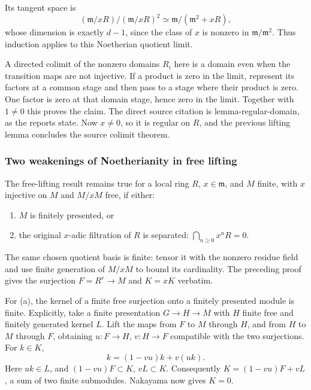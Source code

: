 Its tangent space is \[
 (\mathfrak m/xR)/(\mathfrak m/xR)^2
 \simeq\mathfrak m/(\mathfrak m^2+xR),
\] whose dimension is exactly \(d-1\), since the class of \(x\) is nonzero in \(\mathfrak m/\mathfrak m^2\). Thus induction applies to this Noetherian quotient limit.

A directed colimit of the nonzero domains \(R_i\) here is a domain even when the transition maps are not injective. If a product is zero in the limit, represent its factors at a common stage and then pass to a stage where their product is zero. One factor is zero at that domain stage, hence zero in the limit. Together with \(1\ne0\) this proves the claim. The direct source citation is lemma-regular-domain, as the reports state. Now \(x\ne0\), so it is regular on \(R\), and the previous lifting lemma concludes the source colimit theorem.

\subsubsection{Two weakenings of Noetherianity in free lifting}\label{algebra-proof-020-two-weakenings-of-noetherianity-in-free-lifting}

The free-lifting result remains true for a local ring \(R\), \(x\in\mathfrak m\), and \(M\) finite, with \(x\) injective on \(M\) and \(M/xM\) free, if either:

\begin{enumerate}
\def\labelenumi{(\alph{enumi})}
\item
  \(M\) is finitely presented, or
\item
  the original \(x\)-adic filtration of \(R\) is separated: \(\bigcap_{n\ge0}x^nR=0\).
\end{enumerate}

The same chosen quotient basis is finite: tensor it with the nonzero residue field and use finite generation of \(M/xM\) to bound its cardinality. The preceding proof gives the surjection \(F=R^r\to M\) and \(K=xK\) verbatim.

For (a), the kernel of a finite free surjection onto a finitely presented module is finite. Explicitly, take a finite presentation \(G\to H\to M\) with \(H\) finite free and finitely generated kernel \(L\). Lift the maps from \(F\) to \(M\) through \(H\), and from \(H\) to \(M\) through \(F\), obtaining \(u:F\to H\), \(v:H\to F\) compatible with the two surjections. For \(k\in K\), \[
 k=(1-vu)k+v(uk).
\] Here \(uk\in L\), and \((1-vu)F\subset K\), \(vL\subset K\). Consequently \(K=(1-vu)F+vL\), a sum of two finite submodules. Nakayama now gives \(K=0\).

